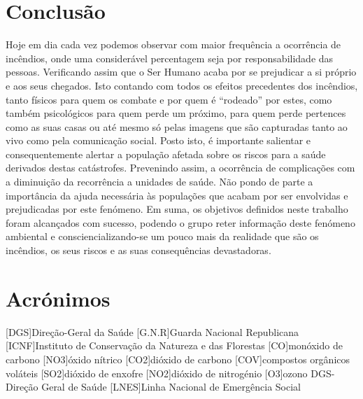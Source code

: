 \documentclass{report}
\begin{document}
\chapter{Conclusão}
Hoje em dia cada vez podemos observar com maior frequência a ocorrência de incêndios, onde uma considerável percentagem seja por responsabilidade das pessoas. Verificando assim que o Ser Humano acaba por se prejudicar a si próprio e aos seus chegados. Isto contando com todos os efeitos precedentes dos incêndios, tanto físicos para quem os combate e por quem é “rodeado” por estes, como também psicológicos para quem perde um próximo, para quem perde pertences como as suas casas ou até mesmo só pelas imagens que são capturadas tanto ao vivo como pela comunicação social.
Posto isto, é importante salientar e consequentemente alertar a população afetada sobre os riscos para a saúde derivados destas catástrofes. Prevenindo assim, a ocorrência de complicações com a diminuição da recorrência a unidades de saúde. Não pondo de parte a importância da ajuda necessária às populações que acabam por ser envolvidas e prejudicadas por este fenómeno.
Em suma, os objetivos definidos neste trabalho foram alcançados com sucesso, podendo o grupo reter informação deste fenómeno ambiental e consciencializando-se um pouco mais da realidade que são os incêndios, os seus riscos e as suas consequências devastadoras.




\chapter*{Acrónimos}

\begin{acronym}
 [DGS]{Direção-Geral da Saúde}
 [G.N.R]{Guarda Nacional Republicana}
 [ICNF]{Instituto de Conservação da Natureza e das Florestas}
 [CO]{monóxido de carbono}
 [NO3]{óxido nítrico}
 [CO2]{dióxido de carbono}
 [COV]{compostos orgânicos voláteis}
 [SO2]{dióxido de enxofre}
 [NO2]{dióxido de nitrogénio}
 [O3]{ozono DGS- Direção Geral de Saúde}
 [LNES]{Linha Nacional de Emergência Social}
\end{acronym}
 


\printbibliography
\end{document}

